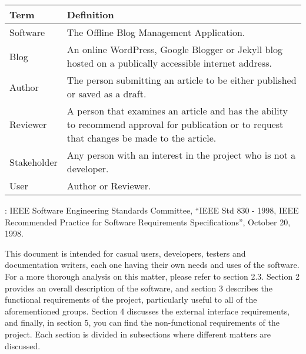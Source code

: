 
\begin{center}
    \begin{tabularx}{\textwidth}{l L}
        \toprule
        \textbf{Term} & \textbf{Definition} \\
        \midrule
        Software      & The Offline Blog Management Application. \\
        Blog          & An online WordPress, Google Blogger or Jekyll blog hosted on a publically accessible
                        internet address. \\
        Author        & The person submitting an article to be either published or saved as a draft. \\
        Reviewer      & A person that examines an article and has the ability to recommend approval for publication or
                        to request that changes be made to the article. \\
        Stakeholder   & Any person with an interest in the project who is not a developer. \\
        User          & Author or Reviewer. \\
        \bottomrule
    \end{tabularx}
\end{center}


\cite{ieee1998ieee}: IEEE Software Engineering Standards Committee, “IEEE Std 830 - 1998, IEEE Recommended Practice for
Software Requirements Specifications”, October 20, 1998.


This document is intended for casual users, developers, testers and documentation writers, each one having their own
needs and uses of the software. For a more thorough analysis on this matter, please refer to section 2.3. Section 2
provides an overall description of the software, and section 3 describes the functional requirements of the project,
particularly useful to all of the aforementioned groups. Section 4 discusses the external interface requirements, and
finally, in section 5, you can find the non-functional requirements of the project. Each section is divided in
subsections where different matters are discussed.
